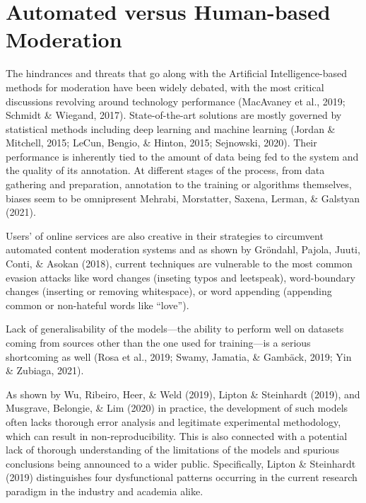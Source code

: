\documentclass[
  10pt,
  dvipsnames,enabledeprecatedfontcommands]{scrartcl}
\begin{document}
\hypertarget{automated-versus-human-based-moderation}{%
\section{Automated versus Human-based
Moderation}\label{automated-versus-human-based-moderation}}

The hindrances and threats that go along with the Artificial
Intelligence-based methods for moderation have been widely debated, with
the most critical discussions revolving around technology performance
(MacAvaney et al., 2019; Schmidt \& Wiegand, 2017). State-of-the-art
solutions are mostly governed by statistical methods including deep
learning and machine learning (Jordan \& Mitchell, 2015; LeCun, Bengio,
\& Hinton, 2015; Sejnowski, 2020). Their performance is inherently tied
to the amount of data being fed to the system and the quality of its
annotation. At
different stages of the process, from data gathering and preparation,
annotation to the training or algorithms themselves, biases seem to be
omnipresent Mehrabi, Morstatter, Saxena, Lerman, \& Galstyan (2021).

Users' of online
services are also creative in their strategies to circumvent automated
content moderation systems and as shown by Gröndahl, Pajola, Juuti,
Conti, \& Asokan (2018), current techniques are vulnerable to the most
common evasion attacks like word changes (inseting typos and leetspeak),
word-boundary changes (inserting or removing whitespace), or word
appending (appending common or non-hateful words like ``love'').

Lack of
generalisability of the models---the ability to perform well on datasets
coming from sources other than the one used for training---is a serious
shortcoming as well (Rosa et al., 2019; Swamy, Jamatia, \& Gambäck,
2019; Yin \& Zubiaga, 2021).

As shown by Wu, Ribeiro, Heer, \& Weld (2019), Lipton \& Steinhardt
(2019), and Musgrave, Belongie, \& Lim (2020) in practice, the
development of such models often lacks thorough error analysis and
legitimate experimental methodology, which can result in
non-reproducibility. This is also connected with a potential lack of
thorough understanding of the limitations of the models and spurious
conclusions being announced to a wider public. Specifically, Lipton \&
Steinhardt (2019) distinguishes four dysfunctional patterns occurring in
the current research paradigm in the industry and academia alike.
\end{document}
